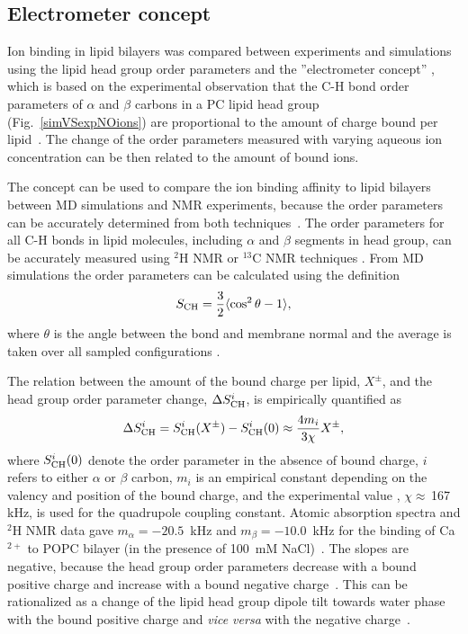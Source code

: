 \documentclass[aip,jcp,twocolumn]{revtex4}
\begin{document}
\subsection{Electrometer concept} \label{section:electrometer}
Ion binding in lipid bilayers was compared between experiments and simulations 
using the lipid head group order parameters and the
''electrometer concept'' \cite{seelig87,catte16}, which
is based on the experimental observation that the C-H bond
order parameters of $\alpha$ and $\beta$ carbons in a PC lipid head group
(Fig.~\ref{simVSexpNOions}) are proportional to the amount 
of charge bound per lipid~\cite{seelig87}.
The change of the order parameters measured with varying aqueous
ion concentration can be then related to the amount of bound ions.

The concept can be used to compare the ion binding affinity to lipid 
bilayers between MD simulations and  NMR experiments, because the order
parameters can be accurately determined from both techniques~\cite{catte16,ollila16}.
The order parameters for all C-H bonds in lipid molecules, including
$\alpha$ and $\beta$ segments in head group, can be accurately measured
using $^2$H NMR or $^{13}$C NMR techniques \cite{ollila16}. From MD simulations the
order parameters can be calculated using the definition
\begin{equation}\label{OP}
S_{\rm CH}=\frac{3}{2}\langle \cos^2\theta -1 \rangle,
\end{equation}
where $\theta$ is the angle between the bond and membrane
normal and the average is taken over all sampled configurations \cite{ollila16}.

The relation between the amount of the bound charge per lipid,  $X^\pm$, and
the head group order parameter change, $\Delta S_{\rm{CH}}^{i}$,
is empirically quantified as~\cite{seelig87,ferreira16}
\begin{equation}\label{OPchangeEQ}
  \Delta S_{\rm{CH}}^{i}= S_{\rm{CH}}^{i}(X^\pm)-S_{\rm{CH}}^{i}(0) \approx \frac{4m_i }{3\chi}X^\pm,
\end{equation}
where $S_{\rm{CH}}^{i}(0)$ denote the order parameter in the absence of bound charge,
$i$ refers to either $\alpha$ or $\beta$ carbon,
$m_i$ is an empirical constant depending on the valency and position of the bound charge,
and the experimental value \cite{seelig77,davis83}, $\chi \approx$\,167\,kHz, is used for the quadrupole coupling constant.
Atomic absorption spectra and $^2$H NMR data gave
$m_\alpha=-20.5$~kHz  and $m_\beta=-10.0$~kHz for the binding of
Ca$^{2+}$ to POPC bilayer (in the presence of 100~mM NaCl)~\cite{altenbach84,ollila16,catte16}.
The slopes are negative, because the head group order parameters
decrease with a bound positive charge and increase with a bound negative
charge~\cite{ollila16,catte16}. This can be rationalized as a change
of the lipid head group dipole tilt towards water phase with the bound positive
charge and {\it vice versa} with the negative charge~\cite{seelig87}. 
\end{document}
